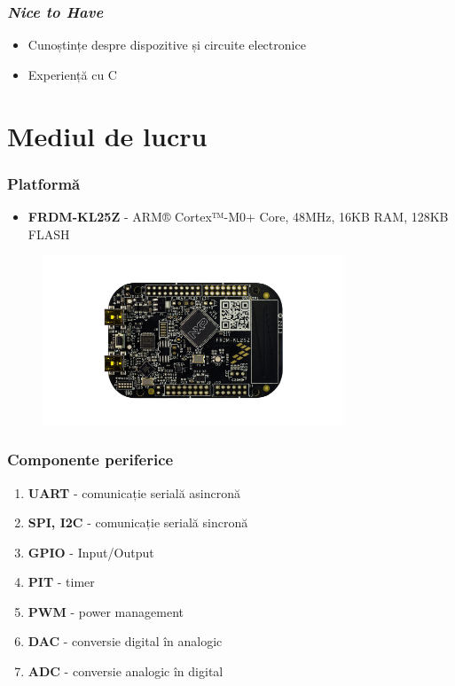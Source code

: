 \documentclass[xcolor={table}]{beamer}
\begin{document}
    	\begin{frame}
    		\frametitle{\textit{Nice to Have}}
    		\begin{itemize}
    			\item Cunoștințe despre dispozitive și circuite electronice
    			\item Experiență cu C
    		\end{itemize}
    	\end{frame}

	\section{Mediul de lucru}
		\begin{frame}
			\frametitle{Platformă}
			\begin{itemize}
				\item \textbf{FRDM-KL25Z} - ARM® Cortex™-M0+ Core, 48MHz, 16KB RAM, 128KB FLASH
			\end{itemize}
			\begin{figure}
                \centering
                \includegraphics[width=9cm]{images/FRDM-KL25Z.png}
            \end{figure}
		\end{frame}
		
		\begin{frame}
			\frametitle{Componente periferice}
			\begin{enumerate}[<+->]
				\item \textbf{UART} - comunicație serială asincronă
				\item \textbf{SPI, I2C} - comunicație serială sincronă
				\item \textbf{GPIO} - Input/Output
				\item \textbf{PIT} - timer
				\item \textbf{PWM} - power management
				\item \textbf{DAC} - conversie digital în analogic
				\item \textbf{ADC} - conversie analogic în digital
			\end{enumerate}
		\end{frame}
		
\end{document}

